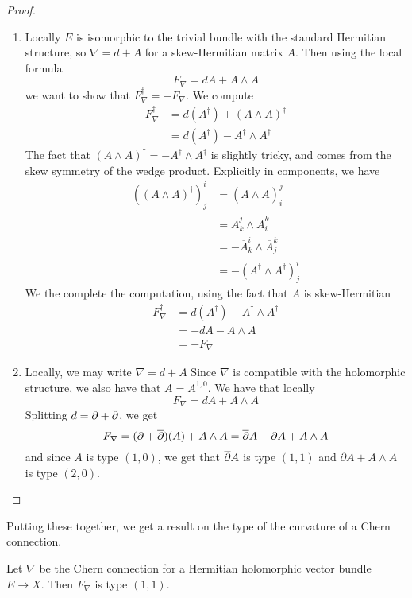 %
\begin{proof} \enumbreak
\begin{enumerate}
  \item Locally $E$ is isomorphic to the trivial bundle with the standard Hermitian
  structure, so $\nabla = d + A$ for a skew-Hermitian matrix $A$. Then using
  the local formula
  \[
  F_\nabla = dA + A \wedge A
  \]
  we want to show that $F_\nabla^\dagger = -F_\nabla$. We compute
  \begin{align*}
  F_\nabla^\dagger &= d(A^\dagger) + (A \wedge A)^\dagger \\
  &= d(A^\dagger) - A^\dagger \wedge A^\dagger
  \end{align*}
  The fact that $(A\wedge A)^\dagger = -A^\dagger \wedge A^\dagger$ is slightly tricky,
  and comes from the skew symmetry of the wedge product. Explicitly in components,
  we have
  \begin{align*}
  ((A \wedge A)^\dagger)^i_j &= (\overline{A} \wedge \overline{A})^j_i \\
  &= \overline{A}^j_k \wedge \overline{A}^k_i \\
  &= -\overline{A}^i_k \wedge \overline{A}^k_j \\
  &= - (A^\dagger \wedge A^\dagger)^i_j
  \end{align*}
  We the complete the computation, using the fact that $A$ is skew-Hermitian
  \begin{align*}
  F_\nabla^\dagger &= d(A^\dagger) - A^\dagger \wedge A^\dagger \\
  &= -dA - A \wedge A \\
  &= -F_\nabla
  \end{align*}
  \item Locally, we may write $\nabla = d + A$ Since $\nabla$ is compatible with the
  holomorphic structure, we also have that $A = A^{1,0}$. We have that locally
  \[
  F_\nabla = dA + A \wedge A
  \]
  Splitting $d = \partial + \overline{\partial}$, we get
  \[
  F_\nabla = (\partial + \overline{\partial})(A) + A \wedge A = \overline{\partial} A + \partial A + A \wedge A
  \]
  and since $A$ is type $(1,0)$, we get that $\overline{\partial} A$ is type $(1,1)$ and
  $\partial A + A \wedge A$ is type $(2,0)$.
\end{enumerate}
\end{proof}
%
Putting these together, we get a result on the type of the curvature of a Chern connection.
%
\begin{prop}
Let $\nabla$ be the Chern connection for a Hermitian holomorphic vector bundle
$E \to X$. Then $F_\nabla$ is type $(1,1)$.
\end{prop}

